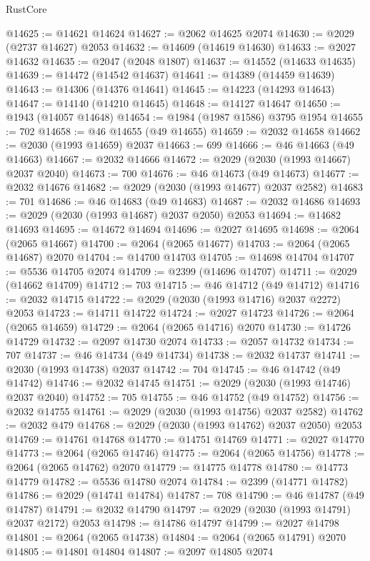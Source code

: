 \begin{lexlean}{RustCore}
\begin{coremodule}
@14625 := @14621 @14624
@14627 := @2062 @14625 @2074
@14630 := @2029 (@2737 @14627) @2053
@14632 := @14609 (@14619 @14630)
@14633 := @2027 @14632
@14635 := @2047 (@2048 @1807)
@14637 := @14552 (@14633 @14635)
@14639 := @14472 (@14542 @14637)
@14641 := @14389 (@14459 @14639)
@14643 := @14306 (@14376 @14641)
@14645 := @14223 (@14293 @14643)
@14647 := @14140 (@14210 @14645)
@14648 := @14127 @14647
@14650 := @1943 (@14057 @14648)
@14654 := @1984 (@1987 @1586) @3795 @1954
@14655 := 702
@14658 := @46 @14655 (@49 @14655)
@14659 := @2032 @14658
@14662 := @2030 (@1993 @14659) @2037
@14663 := 699
@14666 := @46 @14663 (@49 @14663)
@14667 := @2032 @14666
@14672 := @2029 (@2030 (@1993 @14667) @2037 @2040)
@14673 := 700
@14676 := @46 @14673 (@49 @14673)
@14677 := @2032 @14676
@14682 := @2029 (@2030 (@1993 @14677) @2037 @2582)
@14683 := 701
@14686 := @46 @14683 (@49 @14683)
@14687 := @2032 @14686
@14693 := @2029 (@2030 (@1993 @14687) @2037 @2050) @2053
@14694 := @14682 @14693
@14695 := @14672 @14694
@14696 := @2027 @14695
@14698 := @2064 (@2065 @14667)
@14700 := @2064 (@2065 @14677)
@14703 := @2064 (@2065 @14687) @2070
@14704 := @14700 @14703
@14705 := @14698 @14704
@14707 := @5536 @14705 @2074
@14709 := @2399 (@14696 @14707)
@14711 := @2029 (@14662 @14709)
@14712 := 703
@14715 := @46 @14712 (@49 @14712)
@14716 := @2032 @14715
@14722 := @2029 (@2030 (@1993 @14716) @2037 @2272) @2053
@14723 := @14711 @14722
@14724 := @2027 @14723
@14726 := @2064 (@2065 @14659)
@14729 := @2064 (@2065 @14716) @2070
@14730 := @14726 @14729
@14732 := @2097 @14730 @2074
@14733 := @2057 @14732
@14734 := 707
@14737 := @46 @14734 (@49 @14734)
@14738 := @2032 @14737
@14741 := @2030 (@1993 @14738) @2037
@14742 := 704
@14745 := @46 @14742 (@49 @14742)
@14746 := @2032 @14745
@14751 := @2029 (@2030 (@1993 @14746) @2037 @2040)
@14752 := 705
@14755 := @46 @14752 (@49 @14752)
@14756 := @2032 @14755
@14761 := @2029 (@2030 (@1993 @14756) @2037 @2582)
@14762 := @2032 @479
@14768 := @2029 (@2030 (@1993 @14762) @2037 @2050) @2053
@14769 := @14761 @14768
@14770 := @14751 @14769
@14771 := @2027 @14770
@14773 := @2064 (@2065 @14746)
@14775 := @2064 (@2065 @14756)
@14778 := @2064 (@2065 @14762) @2070
@14779 := @14775 @14778
@14780 := @14773 @14779
@14782 := @5536 @14780 @2074
@14784 := @2399 (@14771 @14782)
@14786 := @2029 (@14741 @14784)
@14787 := 708
@14790 := @46 @14787 (@49 @14787)
@14791 := @2032 @14790
@14797 := @2029 (@2030 (@1993 @14791) @2037 @2172) @2053
@14798 := @14786 @14797
@14799 := @2027 @14798
@14801 := @2064 (@2065 @14738)
@14804 := @2064 (@2065 @14791) @2070
@14805 := @14801 @14804
@14807 := @2097 @14805 @2074

\end{coremodule}
\end{lexlean}
